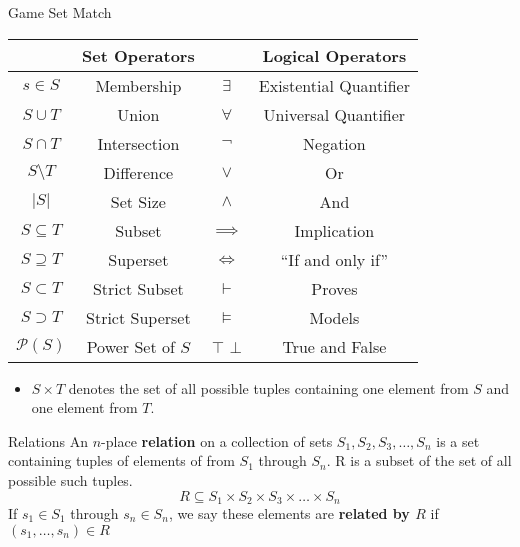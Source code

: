\documentclass[11pt]{beamer}
\begin{document}
\begin{frame}[fragile=singleslide]{Game Set Match}
\center
\begin{tabular}{|| c | c || c | c ||}
\hline 
 & Set Operators &  & Logical Operators\\ \hline
$s \in S$ & Membership & $\exists$ & Existential Quantifier \\ \hline
$S \cup T $ & Union & $\forall$ & Universal Quantifier \\ \hline
$S \cap T $ & Intersection & $\neg$ & Negation \\ \hline
$S \setminus T$ & Difference & $\lor$ & Or \\ \hline
$|S|$ & Set Size & $\land$ & And\\ \hline
$ S \subseteq T $ & Subset & $\implies$ & Implication \\ \hline
$ S \supseteq T $ & Superset & $\iff$ & ``If and only if''\\ \hline
$ S \subset T $ & Strict Subset & $\vdash$ & Proves \\ \hline
$ S \supset T $ & Strict Superset & $\models$ & Models\\ \hline
$\mathcal{P}(S)$ & Power Set of $S$ & $\top$ $\bot$ & True and False \\ \hline    
\end{tabular}

\begin{itemize}
\item $S \times T$ denotes the set of all possible tuples containing one element from $S$ and one element from $T$. 
\end{itemize}
\end{frame}


\begin{frame}[fragile=singleslide]{Relations}
An $n$-place \textbf{relation} on a collection of sets $S_1, S_2, S_3, \dots, S_n$ is a set containing tuples of elements of from $S_1$ through $S_n$.  R is a subset of the set of all possible such tuples.   
\begin{equation}
R \subseteq S_1 \times S_2 \times S_3 \times \dots \times S_n
\end{equation}
If $s_1 \in S_1$ through $s_n \in S_n$, we say these elements are \textbf{related by $R$} if $(s_1,\dots,s_n) \in R$ 
\end{frame}
\end{document}
